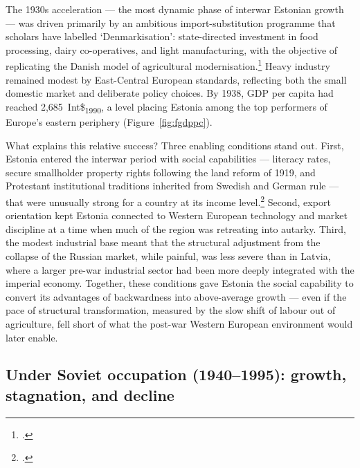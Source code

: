 \documentclass[12pt,a4paper]{article}
\newcommand{\intlnineteen}{Int\$\textsubscript{1990}}   %
\begin{document}
The 1930s acceleration — the most dynamic phase of interwar Estonian growth — was driven primarily by an ambitious import-substitution programme that scholars have labelled `Denmarkisation': state-directed investment in food processing, dairy co-operatives, and light manufacturing, with the objective of replicating the Danish model of agricultural modernisation.\footnote{\autocite{norkus_denmarkisation}.} Heavy industry remained modest by East-Central European standards, reflecting both the small domestic market and deliberate policy choices. By 1938, GDP per capita had reached 2,685~\intlnineteen{}, a level placing Estonia among the top performers of Europe's eastern periphery (Figure~\ref{fig:fgdppc}).

What explains this relative success? Three enabling conditions stand out. First, Estonia entered the interwar period with social capabilities — literacy rates, secure smallholder property rights following the land reform of 1919, and Protestant institutional traditions inherited from Swedish and German rule — that were unusually strong for a country at its income level.\footnote{\autocite[1484--1489]{berendregions2020}.} Second, export orientation kept Estonia connected to Western European technology and market discipline at a time when much of the region was retreating into autarky. Third, the modest industrial base meant that the structural adjustment from the collapse of the Russian market, while painful, was less severe than in Latvia, where a larger pre-war industrial sector had been more deeply integrated with the imperial economy. Together, these conditions gave Estonia the social capability to convert its advantages of backwardness into above-average growth — even if the pace of structural transformation, measured by the slow shift of labour out of agriculture, fell short of what the post-war Western European environment would later enable.

\subsection{Under Soviet occupation (1940--1995): growth, stagnation, and decline}
\label{subsec:soviet-implications}

%
\end{document}
